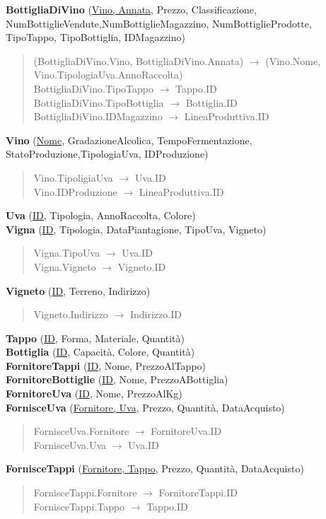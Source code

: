 \textbf{BottigliaDiVino} (\underline{Vino, Annata}, Prezzo, Classificazione, NumBottiglieVendute,NumBottiglieMagazzino, NumBottiglieProdotte, TipoTappo, TipoBottiglia, IDMagazzino)
\begin{verse}
	(BottigliaDiVino.Vino, BottigliaDiVino.Annata) $\to$ (Vino.Nome, Vino.TipologiaUva.AnnoRaccolta)\\
	BottigliaDiVino.TipoTappo $\to$ Tappo.ID\\
	BottigliaDiVino.TipoBottiglia $\to$ Bottiglia.ID\\
	BottigliaDiVino.IDMagazzino $\to$ LineaProduttiva.ID
\end{verse} 
\textbf{Vino} (\underline{Nome}, GradazioneAlcolica, TempoFermentazione, StatoProduzione,TipologiaUva, IDProduzione)
\begin{verse}
	Vino.TipoligiaUva $\to$ Uva.ID\\
	Vino.IDProduzione $\to$ LineaProduttiva.ID
\end{verse} 
\textbf{Uva} (\underline{ID}, Tipologia, AnnoRaccolta, Colore)\\
\textbf{Vigna} (\underline{ID}, Tipologia, DataPiantagione, TipoUva, Vigneto)
\begin{verse}
	Vigna.TipoUva $\to$ Uva.ID\\
	Vigna.Vigneto $\to$ Vigneto.ID
\end{verse} 
\textbf{Vigneto} (\underline{ID}, Terreno, Indirizzo)
\begin{verse}
	Vigneto.Indirizzo $\to$ Indirizzo.ID
\end{verse} 
\textbf{Tappo} (\underline{ID}, Forma, Materiale, Quantità)\\
\textbf{Bottiglia} (\underline{ID}, Capacità, Colore, Quantità)\\
\textbf{FornitoreTappi} (\underline{ID}, Nome, PrezzoAlTappo)\\
\textbf{FornitoreBottiglie} (\underline{ID}, Nome, PrezzoABottiglia)\\
\textbf{FornitoreUva} (\underline{ID}, Nome, PrezzoAlKg)\\
\textbf{FornisceUva} (\underline{Fornitore, Uva}, Prezzo, Quantità, DataAcquisto)
\begin{verse}
	FornisceUva.Fornitore $\to$ FornitoreUva.ID\\
	FornisceUva.Uva $\to$ Uva.ID
\end{verse}
\textbf{FornisceTappi} (\underline{Fornitore, Tappo}, Prezzo, Quantità, DataAcquisto)
\begin{verse}
	FornisceTappi.Fornitore $\to$ FornitoreTappi.ID\\
	FornisceTappi.Tappo $\to$ Tappo.ID
\end{verse} 
